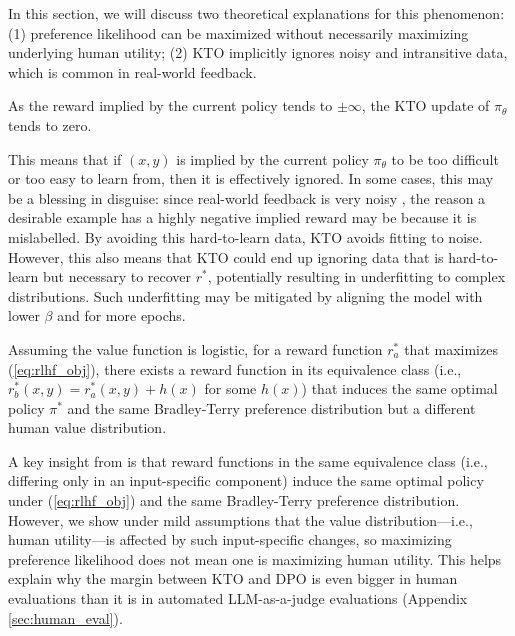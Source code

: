 In this section, we will discuss two theoretical explanations for this phenomenon: (1) preference likelihood can be maximized without necessarily maximizing underlying human utility; (2) KTO implicitly ignores noisy and intransitive data, which is common in real-world feedback.

\begin{proposition}
    As the reward implied by the current policy tends to $\pm \infty$, the KTO update of $\pi_\theta$ tends to zero.
    \label{prop:gradient}
\end{proposition}

This means that if $(x,y)$ is implied by the current policy $\pi_\theta$ to be too difficult or too easy to learn from, then it is effectively ignored.
In some cases, this may be a blessing in disguise: since real-world feedback is very noisy \citep{hoeffler1999constructing}, the reason a desirable example has a highly negative implied reward may be because it is mislabelled.
By avoiding this hard-to-learn data, KTO avoids fitting to noise.
However, this also means that KTO could end up ignoring data that is hard-to-learn but necessary to recover $r^*$, potentially resulting in underfitting to complex distributions.
Such underfitting may be mitigated by aligning the model with lower $\beta$ and for more epochs.

\begin{theorem}
    \label{theorem:omission}
    Assuming the value function is logistic, for a reward function $r^*_a$ that maximizes (\ref{eq:rlhf_obj}), there exists a reward function in its equivalence class (i.e., $r^*_b(x,y) = r^*_a(x,y) + h(x)$ for some $h(x)$) that induces the same optimal policy $\pi^*$ and the same Bradley-Terry preference distribution but a different human value distribution.
\end{theorem}

A key insight from \citet{rafailov2023direct} is that reward functions in the same equivalence class (i.e., differing only in an input-specific component) induce the same optimal policy under (\ref{eq:rlhf_obj}) and the same Bradley-Terry preference distribution.
However, we show under mild assumptions that the value distribution---i.e., human utility---is affected by such input-specific changes, so maximizing preference likelihood does not mean one is maximizing human utility.
This helps explain why the margin between KTO and DPO is even bigger in human evaluations than it is in automated LLM-as-a-judge evaluations (Appendix \ref{sec:human_eval}). 

